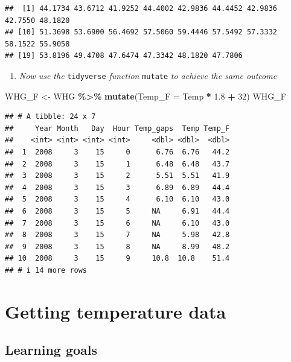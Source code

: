 \documentclass[
]{article}
\newenvironment{Shaded}{\begin{snugshade}}{\end{snugshade}}
\newcommand{\AttributeTok}[1]{\textcolor[rgb]{0.13,0.29,0.53}{#1}}
\newcommand{\DecValTok}[1]{\textcolor[rgb]{0.00,0.00,0.81}{#1}}
\newcommand{\FloatTok}[1]{\textcolor[rgb]{0.00,0.00,0.81}{#1}}
\newcommand{\FunctionTok}[1]{\textcolor[rgb]{0.13,0.29,0.53}{\textbf{#1}}}
\newcommand{\NormalTok}[1]{#1}
\newcommand{\OtherTok}[1]{\textcolor[rgb]{0.56,0.35,0.01}{#1}}
\newcommand{\SpecialCharTok}[1]{\textcolor[rgb]{0.81,0.36,0.00}{\textbf{#1}}}
\providecommand{\tightlist}{%
  \setlength{\itemsep}{0pt}\setlength{\parskip}{0pt}}
\begin{document}
\begin{verbatim}
##  [1] 44.1734 43.6712 41.9252 44.4002 42.9836 44.4452 42.9836 42.7550 48.1820
## [10] 51.3698 53.6900 56.4692 57.5060 59.4446 57.5492 57.3332 58.1522 55.9058
## [19] 53.8196 49.4708 47.6474 47.3342 48.1820 47.7806
\end{verbatim}

\begin{enumerate}
\def\labelenumi{\arabic{enumi}.}
\setcounter{enumi}{3}
\tightlist
\item
  \emph{Now use the} \texttt{tidyverse} \emph{function} \texttt{mutate} \emph{to achieve the same outcome}
\end{enumerate}

\begin{Shaded}
\begin{Highlighting}[]
\NormalTok{WHG\_F }\OtherTok{\textless{}{-}}\NormalTok{ WHG }\SpecialCharTok{\%\textgreater{}\%} \FunctionTok{mutate}\NormalTok{(}\AttributeTok{Temp\_F =}\NormalTok{ Temp }\SpecialCharTok{*} \FloatTok{1.8} \SpecialCharTok{+} \DecValTok{32}\NormalTok{)}
\NormalTok{WHG\_F}
\end{Highlighting}
\end{Shaded}

\begin{verbatim}
## # A tibble: 24 x 7
##     Year Month   Day  Hour Temp_gaps  Temp Temp_F
##    <int> <int> <int> <int>     <dbl> <dbl>  <dbl>
##  1  2008     3    15     0      6.76  6.76   44.2
##  2  2008     3    15     1      6.48  6.48   43.7
##  3  2008     3    15     2      5.51  5.51   41.9
##  4  2008     3    15     3      6.89  6.89   44.4
##  5  2008     3    15     4      6.10  6.10   43.0
##  6  2008     3    15     5     NA     6.91   44.4
##  7  2008     3    15     6     NA     6.10   43.0
##  8  2008     3    15     7     NA     5.98   42.8
##  9  2008     3    15     8     NA     8.99   48.2
## 10  2008     3    15     9     10.8  10.8    51.4
## # i 14 more rows
\end{verbatim}

\section{Getting temperature data}\label{getting-temperature-data}

\subsection{Learning goals}\label{learning-goals-7}
\end{document}

